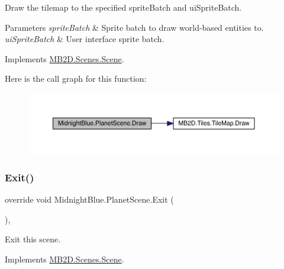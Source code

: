 Draw the tilemap to the specified sprite\+Batch and ui\+Sprite\+Batch. 


\begin{DoxyParams}{Parameters}
{\em sprite\+Batch} & Sprite batch to draw world-\/based entities to.\\
\hline
{\em ui\+Sprite\+Batch} & User interface sprite batch.\\
\hline
\end{DoxyParams}


Implements \hyperlink{class_m_b2_d_1_1_scenes_1_1_scene_a932d33071ecb4c5187367825dba72324}{M\+B2\+D.\+Scenes.\+Scene}.

Here is the call graph for this function\+:
\nopagebreak
\begin{figure}[H]
\begin{center}
\leavevmode
\includegraphics[width=350pt]{class_midnight_blue_1_1_planet_scene_af22a201631e5f8c606ec3f7463635977_cgraph}
\end{center}
\end{figure}
\hypertarget{class_midnight_blue_1_1_planet_scene_af3aab90a13294493e1f2cd29b0fb60e6}{}\label{class_midnight_blue_1_1_planet_scene_af3aab90a13294493e1f2cd29b0fb60e6} 
\subsubsection{\texorpdfstring{Exit()}{Exit()}}
{\footnotesize\ttfamily override void Midnight\+Blue.\+Planet\+Scene.\+Exit (\begin{DoxyParamCaption}{ }\end{DoxyParamCaption})\hspace{0.3cm}{\ttfamily [inline]}, {\ttfamily [virtual]}}



Exit this scene. 



Implements \hyperlink{class_m_b2_d_1_1_scenes_1_1_scene_a099b79e16d23b67349847999d2336813}{M\+B2\+D.\+Scenes.\+Scene}.

